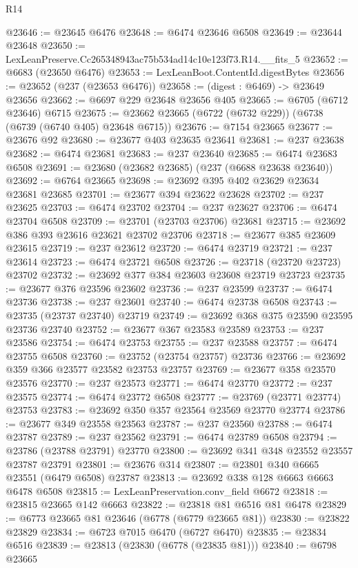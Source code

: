 \begin{lexlean}{R14}
\begin{coremodule}
@23646 := @23645 @6476
@23648 := @6474 @23646 @6508
@23649 := @23644 @23648
@23650 := LexLeanPreserve.Cc265348943ac75b534ad14c10e123f73.R14.__fits_5
@23652 := @6683 (@23650 @6476)
@23653 := LexLeanBoot.ContentId.digestBytes
@23656 := @23652 (@237 (@23653 @6476))
@23658 := (digest : @6469) -> @23649 @23656
@23662 := @6697 @229 @23648 @23656 @405
@23665 := @6705 (@6712 @23646) @6715
@23675 := @23662 @23665 (@6722 (@6732 @229)) (@6738 (@6739 (@6740 @405) @23648 @6715))
@23676 := @7154 @23665
@23677 := @23676 @92
@23680 := @23677 @403 @23635 @23641
@23681 := @237 @23638
@23682 := @6474 @23681
@23683 := @237 @23640
@23685 := @6474 @23683 @6508
@23691 := @23680 (@23682 @23685) (@237 (@6688 @23638 @23640))
@23692 := @6764 @23665
@23698 := @23692 @395 @402 @23629 @23634 @23681 @23685
@23701 := @23677 @394 @23622 @23628
@23702 := @237 @23625
@23703 := @6474 @23702
@23704 := @237 @23627
@23706 := @6474 @23704 @6508
@23709 := @23701 (@23703 @23706) @23681
@23715 := @23692 @386 @393 @23616 @23621 @23702 @23706
@23718 := @23677 @385 @23609 @23615
@23719 := @237 @23612
@23720 := @6474 @23719
@23721 := @237 @23614
@23723 := @6474 @23721 @6508
@23726 := @23718 (@23720 @23723) @23702
@23732 := @23692 @377 @384 @23603 @23608 @23719 @23723
@23735 := @23677 @376 @23596 @23602
@23736 := @237 @23599
@23737 := @6474 @23736
@23738 := @237 @23601
@23740 := @6474 @23738 @6508
@23743 := @23735 (@23737 @23740) @23719
@23749 := @23692 @368 @375 @23590 @23595 @23736 @23740
@23752 := @23677 @367 @23583 @23589
@23753 := @237 @23586
@23754 := @6474 @23753
@23755 := @237 @23588
@23757 := @6474 @23755 @6508
@23760 := @23752 (@23754 @23757) @23736
@23766 := @23692 @359 @366 @23577 @23582 @23753 @23757
@23769 := @23677 @358 @23570 @23576
@23770 := @237 @23573
@23771 := @6474 @23770
@23772 := @237 @23575
@23774 := @6474 @23772 @6508
@23777 := @23769 (@23771 @23774) @23753
@23783 := @23692 @350 @357 @23564 @23569 @23770 @23774
@23786 := @23677 @349 @23558 @23563
@23787 := @237 @23560
@23788 := @6474 @23787
@23789 := @237 @23562
@23791 := @6474 @23789 @6508
@23794 := @23786 (@23788 @23791) @23770
@23800 := @23692 @341 @348 @23552 @23557 @23787 @23791
@23801 := @23676 @314
@23807 := @23801 @340 @6665 @23551 (@6479 @6508) @23787
@23813 := @23692 @338 @128 @6663 @6663 @6478 @6508
@23815 := LexLeanPreservation.conv_field @6672
@23818 := @23815 @23665 @142 @6663
@23822 := @23818 @81 @6516 @81 @6478
@23829 := @6773 @23665 @81 @23646 (@6778 (@6779 @23665 @81))
@23830 := @23822 @23829
@23834 := @6723 @7015 @6470 (@6727 @6470)
@23835 := @23834 @6516
@23839 := @23813 (@23830 (@6778 (@23835 @81)))
@23840 := @6798 @23665

\end{coremodule}
\end{lexlean}
